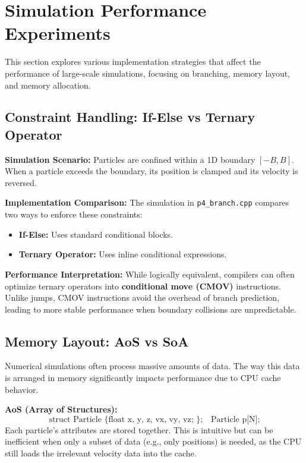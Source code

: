 \section*{Simulation Performance Experiments}

This section explores various implementation strategies that affect the performance of large-scale simulations, focusing on branching, memory layout, and memory allocation.

\subsection*{Constraint Handling: If-Else vs Ternary Operator}

\textbf{Simulation Scenario:}
Particles are confined within a 1D boundary $[-B, B]$. When a particle exceeds the boundary, its position is clamped and its velocity is reversed.

\textbf{Implementation Comparison:}
The simulation in \texttt{p4\_branch.cpp} compares two ways to enforce these constraints:
\begin{itemize}
    \item \textbf{If-Else:} Uses standard conditional blocks.
    \item \textbf{Ternary Operator:} Uses inline conditional expressions.
\end{itemize}

\textbf{Performance Interpretation:}
While logically equivalent, compilers can often optimize ternary operators into \textbf{conditional move (CMOV)} instructions. Unlike jumps, CMOV instructions avoid the overhead of branch prediction, leading to more stable performance when boundary collisions are unpredictable.

\subsection*{Memory Layout: AoS vs SoA}

Numerical simulations often process massive amounts of data. The way this data is arranged in memory significantly impacts performance due to CPU cache behavior.

\textbf{AoS (Array of Structures):}
\[
\text{struct Particle \{ float x, y, z, vx, vy, vz; \};} \quad \text{Particle p[N];}
\]
Each particle's attributes are stored together. This is intuitive but can be inefficient when only a subset of data (e.g., only positions) is needed, as the CPU still loads the irrelevant velocity data into the cache.

